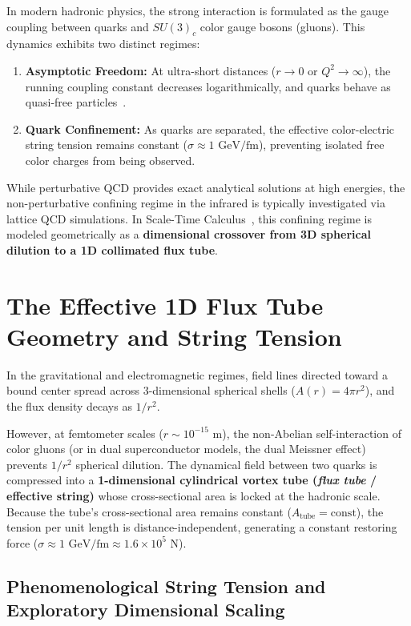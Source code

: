 \documentclass[11pt,a4paper]{article}
\begin{document}
In modern hadronic physics, the strong interaction is formulated as the gauge coupling between quarks and $SU(3)_c$ color gauge bosons (gluons). This dynamics exhibits two distinct regimes:
\begin{enumerate}
    \item \textbf{Asymptotic Freedom:} At ultra-short distances ($r \to 0$ or $Q^2 \to \infty$), the running coupling constant decreases logarithmically, and quarks behave as quasi-free particles~\cite{gross1973,politzer1973}.
    \item \textbf{Quark Confinement:} As quarks are separated, the effective color-electric string tension remains constant ($\sigma \approx 1\text{ GeV/fm}$), preventing isolated free color charges from being observed.
\end{enumerate}

While perturbative QCD provides exact analytical solutions at high energies, the non-perturbative confining regime in the infrared is typically investigated via lattice QCD simulations. In Scale-Time Calculus~\cite{scale_calculus}, this confining regime is modeled geometrically as a \textbf{dimensional crossover from 3D spherical dilution to a 1D collimated flux tube}.

\section{The Effective 1D Flux Tube Geometry and String Tension}
\label{sec:doyum_mekanizmasi}

In the gravitational and electromagnetic regimes, field lines directed toward a bound center spread across 3-dimensional spherical shells ($A(r) = 4\pi r^2$), and the flux density decays as $1/r^2$.

However, at femtometer scales ($r \sim 10^{-15}\text{ m}$), the non-Abelian self-interaction of color gluons (or in dual superconductor models, the dual Meissner effect) prevents $1/r^2$ spherical dilution. The dynamical field between two quarks is compressed into a \textbf{1-dimensional cylindrical vortex tube (\textit{flux tube} / effective string)} whose cross-sectional area is locked at the hadronic scale. Because the tube's cross-sectional area remains constant ($A_{\mathrm{tube}} = \text{const}$), the tension per unit length is distance-independent, generating a constant restoring force ($\sigma \approx 1\text{ GeV/fm} \approx 1.6 \times 10^5\text{ N}$).

\subsection{Phenomenological String Tension and Exploratory Dimensional Scaling}
\label{sec:hiyerarsi_cozumu_en}
\end{document}
